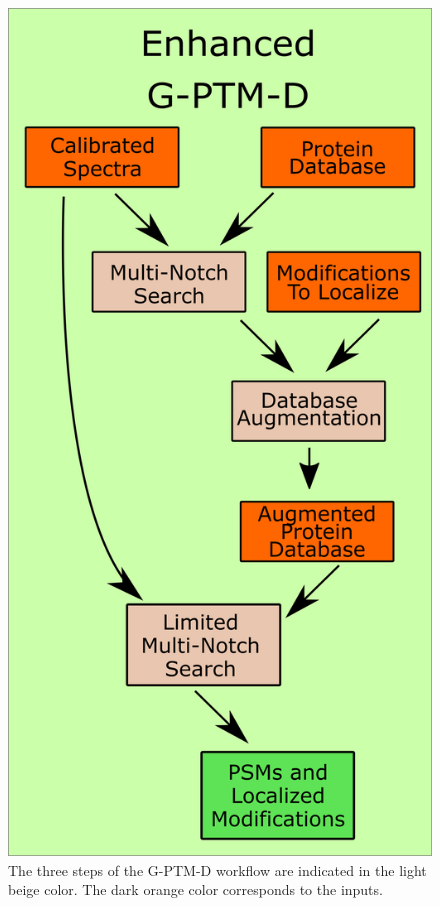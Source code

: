 \documentclass[journal=jprobs,manuscript=article]{achemso}
\begin{document}
\begin{figure}[H]
  \includegraphics[scale=0.5]{paperDiagram.png}
  \caption{The three steps of the G-PTM-D workflow are indicated in the light beige color. The dark orange color corresponds to the inputs.}
  \label{fgr:diagram}
\end{figure}
\end{document}

